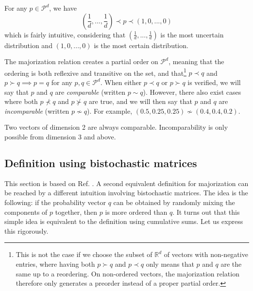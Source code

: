 \begin{remark}
    For any $p \in \mathcal{P}^d$, we have
    \begin{equation} \label{eq:top_bottom}
        \left(\frac{1}{d}, ..., \frac{1}{d}\right) \prec p \prec (1, 0, ..., 0)
    \end{equation}
    which is fairly intuitive, considering that $(\frac{1}{d}, ..., \frac{1}{d})$ is the most uncertain distribution and $(1, 0, ..., 0)$ is the most certain distribution. %
\end{remark}

The majorization relation creates a partial order on $\mathcal{P}^d$, meaning that the ordering is both reflexive and transitive on the set, and that\footnote{This is not the case if we choose the subset of $\mathbb{R}^d$  of vectors with non-negative entries, where having both $p \succ q$ and $p \prec q$ only means that $p$ and $q$ are the same up to a reordering. On non-ordered vectors, the majorization relation therefore only generates a preorder instead of a proper partial order.} $p \prec q$ and $p \succ q \implies p = q$ for any $p, q \in \mathcal{P}^d$. When either $p \prec q$ or $p \succ q$ is verified, we will say that $p$ and $q$ are \textit{comparable} (written $p \sim q$). However, there also exist cases where both $p \nprec q$ and $p \nsucc q$ are true, and we will then say that $p$ and $q$ are \textit{incomparable} (written $p \nsim q$). For example, $(0.5, 0.25, 0.25) \nsim (0.4, 0.4, 0.2)$.

\begin{remark}
    Two vectors of dimension 2 are always comparable. Incomparability is only possible from dimension 3 and above.
\end{remark}



\subsection{Definition using bistochastic matrices} \label{sec:bistochastic}

This section is based on Ref. \cite[pp. 29-33]{marshall_inequalities_2011}. A second equivalent definition for majorization can be reached by a different intuition involving bistochastic matrices. The idea is the following: if the probability vector $q$ can be obtained by randomly mixing the components of $p$ together, then $p$ is more ordered than $q$. It turns out that this simple idea is equivalent to the definition using cumulative sums. Let us express this rigorously.


